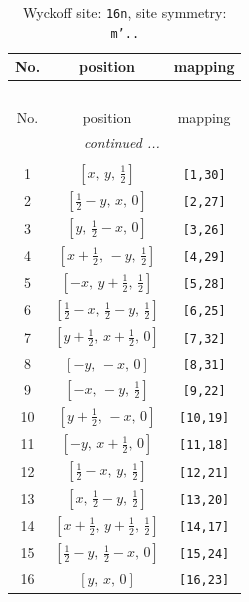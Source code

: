 \documentclass[fleqn,8pt]{jsarticle}
\begin{document}
\renewcommand{\arraystretch}{1.2}
\begin{longtable}{ccc}
\caption{Wyckoff site: {\tt 16n}, site symmetry: {\tt m'..}}
 \\
 \hline \hline
No. & position & mapping \\ \hline \endfirsthead

\multicolumn{2}{l}{\tablename\ \thetable{}} \\
 \hline \hline
No. & position & mapping \\ \hline \endhead

 \hline \hline
\multicolumn{2}{r}{\footnotesize\it continued ...} \\ \endfoot

 \hline \hline
\multicolumn{2}{r}{} \\ \endlastfoot

1 & $\left[ x,\, y,\, \frac{1}{2} \right]$ & {\tt [1,30]} \\ \hline
2 & $\left[ \frac{1}{2} - y,\, x,\, 0 \right]$ & {\tt [2,27]} \\ \hline
3 & $\left[ y,\, \frac{1}{2} - x,\, 0 \right]$ & {\tt [3,26]} \\ \hline
4 & $\left[ x + \frac{1}{2},\, - y,\, \frac{1}{2} \right]$ & {\tt [4,29]} \\ \hline
5 & $\left[ - x,\, y + \frac{1}{2},\, \frac{1}{2} \right]$ & {\tt [5,28]} \\ \hline
6 & $\left[ \frac{1}{2} - x,\, \frac{1}{2} - y,\, \frac{1}{2} \right]$ & {\tt [6,25]} \\ \hline
7 & $\left[ y + \frac{1}{2},\, x + \frac{1}{2},\, 0 \right]$ & {\tt [7,32]} \\ \hline
8 & $\left[ - y,\, - x,\, 0 \right]$ & {\tt [8,31]} \\ \hline
9 & $\left[ - x,\, - y,\, \frac{1}{2} \right]$ & {\tt [9,22]} \\ \hline
10 & $\left[ y + \frac{1}{2},\, - x,\, 0 \right]$ & {\tt [10,19]} \\ \hline
11 & $\left[ - y,\, x + \frac{1}{2},\, 0 \right]$ & {\tt [11,18]} \\ \hline
12 & $\left[ \frac{1}{2} - x,\, y,\, \frac{1}{2} \right]$ & {\tt [12,21]} \\ \hline
13 & $\left[ x,\, \frac{1}{2} - y,\, \frac{1}{2} \right]$ & {\tt [13,20]} \\ \hline
14 & $\left[ x + \frac{1}{2},\, y + \frac{1}{2},\, \frac{1}{2} \right]$ & {\tt [14,17]} \\ \hline
15 & $\left[ \frac{1}{2} - y,\, \frac{1}{2} - x,\, 0 \right]$ & {\tt [15,24]} \\ \hline
16 & $\left[ y,\, x,\, 0 \right]$ & {\tt [16,23]} \\
\end{longtable}
\end{document}

